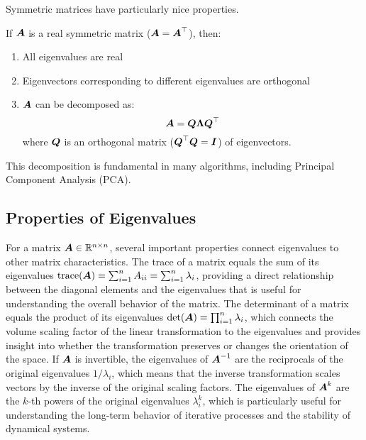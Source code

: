 Symmetric matrices have particularly nice properties.

\begin{theorem}
If $\boldsymbol{A}$ is a real symmetric matrix ($\boldsymbol{A} = \boldsymbol{A}^\top$), then:
\begin{enumerate}
    \item All eigenvalues are real
    \item Eigenvectors corresponding to different eigenvalues are orthogonal
    \item $\boldsymbol{A}$ can be decomposed as:
    \begin{equation}
        \boldsymbol{A} = \boldsymbol{Q}\boldsymbol{\Lambda}\boldsymbol{Q}^\top
    \end{equation}
    where $\boldsymbol{Q}$ is an orthogonal matrix ($\boldsymbol{Q}^\top\boldsymbol{Q} = \boldsymbol{I}$) of eigenvectors.
\end{enumerate}
\end{theorem}

This decomposition is fundamental in many algorithms, including Principal Component Analysis (PCA).

\subsection{Properties of Eigenvalues}

For a matrix $\boldsymbol{A} \in \mathbb{R}^{n \times n}$, several important properties connect eigenvalues to other matrix characteristics. The trace of a matrix equals the sum of its eigenvalues $\text{trace}(\boldsymbol{A}) = \sum_{i=1}^{n} A_{ii} = \sum_{i=1}^{n} \lambda_i$, providing a direct relationship between the diagonal elements and the eigenvalues that is useful for understanding the overall behavior of the matrix. The determinant of a matrix equals the product of its eigenvalues $\det(\boldsymbol{A}) = \prod_{i=1}^{n} \lambda_i$, which connects the volume scaling factor of the linear transformation to the eigenvalues and provides insight into whether the transformation preserves or changes the orientation of the space. If $\boldsymbol{A}$ is invertible, the eigenvalues of $\boldsymbol{A}^{-1}$ are the reciprocals of the original eigenvalues $1/\lambda_i$, which means that the inverse transformation scales vectors by the inverse of the original scaling factors. The eigenvalues of $\boldsymbol{A}^k$ are the $k$-th powers of the original eigenvalues $\lambda_i^k$, which is particularly useful for understanding the long-term behavior of iterative processes and the stability of dynamical systems.

